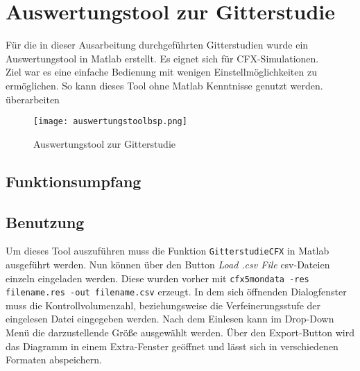 \chapter{Auswertungstool zur Gitterstudie}
Für die in dieser Ausarbeitung durchgeführten Gitterstudien wurde ein Auswertungstool in Matlab erstellt. Es eignet sich für CFX-Simulationen.\\
Ziel war es eine einfache Bedienung mit wenigen Einstellmöglichkeiten zu ermöglichen. So kann dieses Tool ohne Matlab Kenntnisse genutzt werden.
\image überarbeiten
\begin{figure}[htbp]
	\centering
	\label{fig:auswerungbsp}
	\texttt{[image: auswertungstoolbsp.png]}
	\caption{Auswertungstool zur Gitterstudie}
\end{figure}

\section{Funktionsumpfang}
\todo

\section{Benutzung}
Um dieses Tool auszuführen muss die Funktion \texttt{GitterstudieCFX} in Matlab ausgeführt werden. Nun können über den Button \textit{Load .csv File} csv-Dateien einzeln eingeladen werden. Diese wurden vorher mit \texttt{cfx5mondata -res filename.res -out filename.csv} erzeugt. In dem sich öffnenden Dialogfenster muss die Kontrollvolumenzahl, beziehungsweise  die Verfeinerungsstufe der eingelesen Datei eingegeben werden. Nach dem Einlesen kann im Drop-Down Menü die darzustellende Größe ausgewählt werden. Über den Export-Button wird das Diagramm in einem Extra-Fenster geöffnet und lässt sich in verschiedenen Formaten abspeichern.
